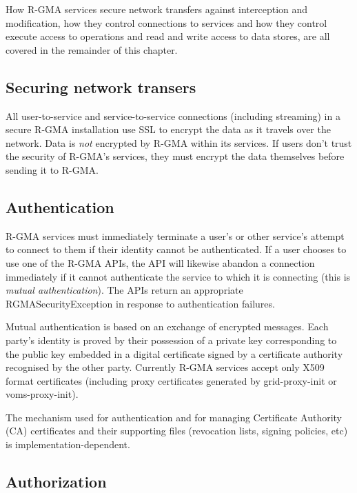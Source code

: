 How R-GMA services secure network transfers against interception and
modification, how they control connections to services and how they
control execute access to operations and read and write access to data
stores, are all covered in the remainder of this chapter.

\subsection{Securing network transers}

All user-to-service and service-to-service connections (including
streaming) in a secure R-GMA installation use SSL to encrypt the data
as it travels over the network. Data is \textit{not} encrypted by
R-GMA within its services. If users don't trust the security of
R-GMA's services, they must encrypt the data themselves before sending
it to R-GMA.
                                                                               

\subsection{Authentication}

R-GMA services must immediately terminate a user's or other service's
attempt to connect to them if their identity cannot be
authenticated. If a user chooses to use one of the R-GMA APIs, the API
will likewise abandon a connection immediately if it cannot
authenticate the service to which it is connecting (this is
\textit{mutual authentication}). The APIs return an appropriate
RGMASecurityException in response to authentication failures.

Mutual authentication is based on an exchange of encrypted messages.
Each party's identity is proved by their possession of a private key
corresponding to the public key embedded in a digital certificate
signed by a certificate authority recognised by the other party.  Currently
R-GMA services accept only X509 format certificates (including proxy certificates generated by
grid-proxy-init or voms-proxy-init).

The mechanism used for authentication and for managing Certificate
Authority (CA) certificates and their supporting files (revocation
lists, signing policies, etc) is implementation-dependent.

\subsection{Authorization}

